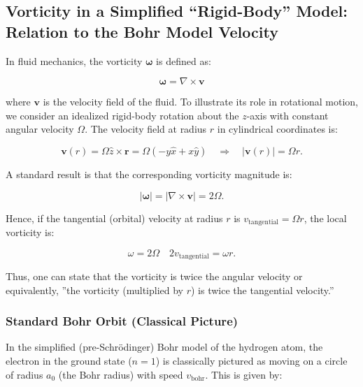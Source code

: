 
\subsection{Vorticity in a Simplified ``Rigid-Body'' Model: Relation to the Bohr Model Velocity}\label{subsec:Relation-to-the-Bohr-Model-Velocity}

In fluid mechanics, the vorticity $\boldsymbol{\omega}$ is defined as:

\begin{equation*}
\boldsymbol{\omega} = \nabla \times \mathbf{v}\label{eq:vorticity}
\end{equation*}

where $\mathbf{v}$ is the velocity field of the fluid. To illustrate its role in rotational motion, we consider an idealized rigid-body rotation about the $z$-axis with constant angular velocity $\Omega$. The velocity field at radius $r$ in cylindrical coordinates is:

\begin{equation*}
    \mathbf{v}(r) = \Omega \hat{z} \times \mathbf{r} = \Omega(-y\hat{x} + x\hat{y}) \quad \Rightarrow \quad |
    \mathbf{v}(r)| = \Omega r.\label{eq:cylindrical-velocity}
\end{equation*}

A standard result is that the corresponding vorticity magnitude is:

\begin{equation}
    |\boldsymbol{\omega}| = \left| \nabla \times \mathbf{v} \right| = 2\Omega.\label{eq:vorticity-magnitude}
\end{equation}

Hence, if the tangential (orbital) velocity at radius $r$ is $v_{\text{tangential}} = \Omega r$, the local vorticity is:

\begin{equation*}
    \omega = 2\Omega \quad 2v_{\text{tangential}} = \omega r.\label{eq:2velocity}
\end{equation*}

Thus, one can state that the vorticity is twice the angular velocity or equivalently, ''the vorticity (multiplied by $r$) is twice the tangential velocity.''

\subsubsection*{Standard Bohr Orbit (Classical Picture)}
In the simplified (pre-Schr\"{o}dinger) Bohr model of the hydrogen atom, the electron in the ground state ($n=1$) is classically pictured as moving on a circle of radius $a_0$ (the Bohr radius) with speed $v_\text{bohr}$. This is given by:

